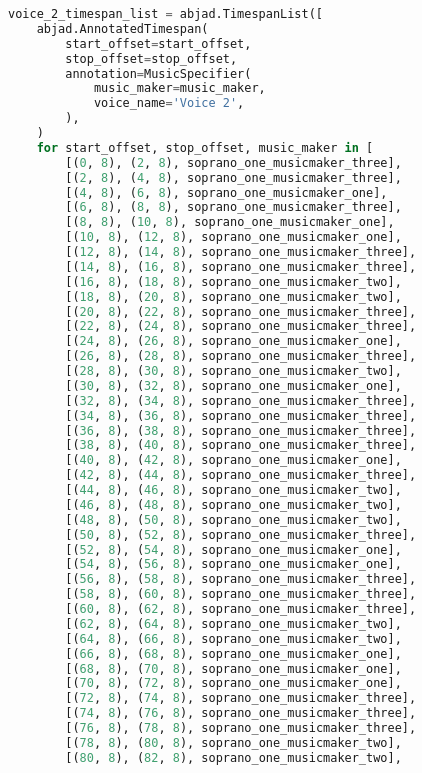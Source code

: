 \begin{lstlisting}[language=Python, caption=Invocation Source Code]
voice_2_timespan_list = abjad.TimespanList([
    abjad.AnnotatedTimespan(
        start_offset=start_offset,
        stop_offset=stop_offset,
        annotation=MusicSpecifier(
            music_maker=music_maker,
            voice_name='Voice 2',
        ),
    )
    for start_offset, stop_offset, music_maker in [
        [(0, 8), (2, 8), soprano_one_musicmaker_three],
        [(2, 8), (4, 8), soprano_one_musicmaker_three],
        [(4, 8), (6, 8), soprano_one_musicmaker_one],
        [(6, 8), (8, 8), soprano_one_musicmaker_three],
        [(8, 8), (10, 8), soprano_one_musicmaker_one],
        [(10, 8), (12, 8), soprano_one_musicmaker_one],
        [(12, 8), (14, 8), soprano_one_musicmaker_three],
        [(14, 8), (16, 8), soprano_one_musicmaker_three],
        [(16, 8), (18, 8), soprano_one_musicmaker_two],
        [(18, 8), (20, 8), soprano_one_musicmaker_two],
        [(20, 8), (22, 8), soprano_one_musicmaker_three],
        [(22, 8), (24, 8), soprano_one_musicmaker_three],
        [(24, 8), (26, 8), soprano_one_musicmaker_one],
        [(26, 8), (28, 8), soprano_one_musicmaker_three],
        [(28, 8), (30, 8), soprano_one_musicmaker_two],
        [(30, 8), (32, 8), soprano_one_musicmaker_one],
        [(32, 8), (34, 8), soprano_one_musicmaker_three],
        [(34, 8), (36, 8), soprano_one_musicmaker_three],
        [(36, 8), (38, 8), soprano_one_musicmaker_three],
        [(38, 8), (40, 8), soprano_one_musicmaker_three],
        [(40, 8), (42, 8), soprano_one_musicmaker_one],
        [(42, 8), (44, 8), soprano_one_musicmaker_three],
        [(44, 8), (46, 8), soprano_one_musicmaker_two],
        [(46, 8), (48, 8), soprano_one_musicmaker_two],
        [(48, 8), (50, 8), soprano_one_musicmaker_two],
        [(50, 8), (52, 8), soprano_one_musicmaker_three],
        [(52, 8), (54, 8), soprano_one_musicmaker_one],
        [(54, 8), (56, 8), soprano_one_musicmaker_one],
        [(56, 8), (58, 8), soprano_one_musicmaker_three],
        [(58, 8), (60, 8), soprano_one_musicmaker_three],
        [(60, 8), (62, 8), soprano_one_musicmaker_three],
        [(62, 8), (64, 8), soprano_one_musicmaker_two],
        [(64, 8), (66, 8), soprano_one_musicmaker_two],
        [(66, 8), (68, 8), soprano_one_musicmaker_one],
        [(68, 8), (70, 8), soprano_one_musicmaker_one],
        [(70, 8), (72, 8), soprano_one_musicmaker_one],
        [(72, 8), (74, 8), soprano_one_musicmaker_three],
        [(74, 8), (76, 8), soprano_one_musicmaker_three],
        [(76, 8), (78, 8), soprano_one_musicmaker_three],
        [(78, 8), (80, 8), soprano_one_musicmaker_two],
        [(80, 8), (82, 8), soprano_one_musicmaker_two],

\end{lstlisting}

